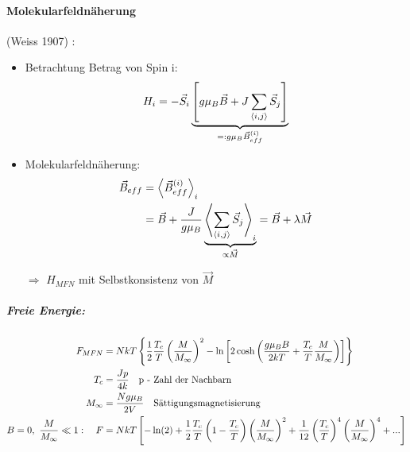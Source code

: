 \paragraph{Molekularfeldnäherung} (Weiss 1907) :
\begin{itemize}
    \item Betrachtung Betrag von Spin i:
    \begin{equation}
        H_i = - \Vec{S}_i \underbrace{\left[g\mu_B\Vec{B}+J \sum_{\expval{i,j}} \Vec{S}_j\right]}_{=: g\mu_B \Vec{B}_{eff}^{(i)}}
    \end{equation}
    \item Molekularfeldnäherung:
    \begin{align}
        \Vec{B}_{eff} &= \expval{\Vec{B}_{eff}^{(i)}}_i \\
        &= \Vec{B} + \frac{J}{g\mu_B} \underbrace{\expval{\sum_{\expval{i,j}} \Vec{S}_j}_i}_{\propto \Vec{M}} = \Vec{B} + \lambda \Vec{M}
    \end{align}
    \item[$\Rightarrow$] $H_{MFN}$ mit Selbstkonsistenz von $\Vec{M}$
\end{itemize}
\subparagraph{Freie Energie:}
\begin{align}
    F_{MFN} &= NkT \left\{ \frac{1}{2} \frac{T_c}{T} \left(\frac{M}{M_\infty}\right)^2 - \ln \left[ 2 \cosh\left( \frac{g\mu_BB}{2kT}+\frac{T_c}{T} \frac{M}{M_\infty}\right)\right]\right\}\\
    T_c &= \frac{Jp}{4k} \qq{p - Zahl der Nachbarn}\\
    M_\infty &= \frac{Ng\mu_B}{2V} \qq{Sättigungsmagnetisierung}\\
    B=0, \ \frac{M}{M_\infty} \ll 1: \quad F &= NkT \left[ -\ln(2) + \frac{1}{2} \frac{T_c}{T} \left(1-\frac{T_c}{T}\right) \left(\frac{M}{M_\infty}\right)^2 + \frac{1}{12} \left(\frac{T_c}{T}\right)^4 \left(\frac{M}{M_\infty}\right)^4+...\right]
\end{align}

